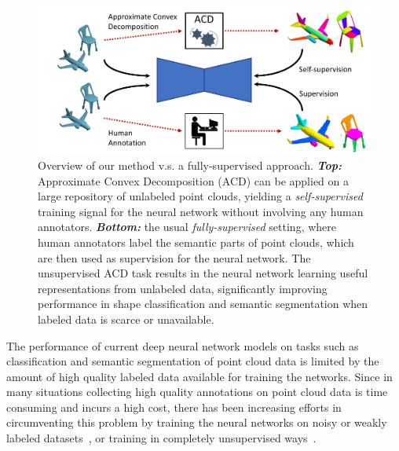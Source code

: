 \begin{figure}[t]
    \centering
    \includegraphics[width=\linewidth]{acd/imgs/visual-summary.pdf}
    \caption{\small{Overview of our method v.s. a fully-supervised approach. \textit{\textbf{Top:}} Approximate Convex Decomposition (ACD) can be applied on a large repository of unlabeled point clouds, yielding a \textit{self-supervised} training signal for the neural network without involving any human annotators. \textit{\textbf{Bottom:}} the usual \textit{fully-supervised} setting, where human annotators label the semantic parts of point clouds, which are then used as supervision for the neural network. The unsupervised ACD task results in the neural network learning useful representations from unlabeled data, significantly improving performance in shape classification and semantic segmentation  when labeled data is scarce or unavailable.}
    }
    \label{fig:vis_summary}
\end{figure}

The performance of current deep neural network models on tasks such as classification and semantic segmentation of point cloud data is limited 
by the
amount of high quality labeled data available for training the networks. 
Since in many situations collecting high quality annotations on point 
cloud data is time consuming and incurs a high cost, there has  
been increasing efforts in circumventing this problem by training 
the neural networks on noisy or weakly labeled datasets~\cite{SharmaPEN},
or training  in completely unsupervised ways~\cite{hassani2019unsupervised,mrt18,yang2018foldingnet,yang2019pointflow,chen2019bae}. 


